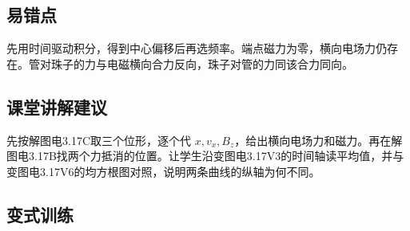 \documentclass[UTF8,fontset=fandol,a4paper,11pt]{ctexart}
\begin{document}


\subsection*{易错点}

先用时间驱动积分，得到中心偏移后再选频率。端点磁力为零，横向电场力仍存在。管对珠子的力与电磁横向合力反向，珠子对管的力同该合力同向。



\subsection*{课堂讲解建议}

先按解图电3.17C取三个位形，逐个代 $x,v_x,B_z$，给出横向电场力和磁力。再在解图电3.17B找两个力抵消的位置。让学生沿变图电3.17V3的时间轴读平均值，并与变图电3.17V6的均方根图对照，说明两条曲线的纵轴为何不同。


\subsection*{变式训练}
\end{document}
